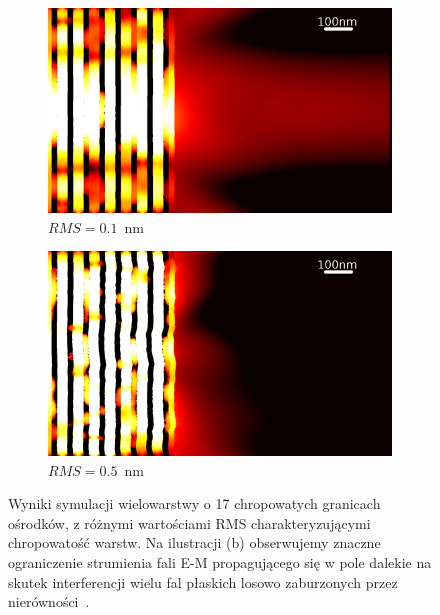 \begin{figure}
	\centering
	\begin{subfigure}[b]{.45\textwidth}
		\includegraphics[width=\textwidth]{images/multilayer/oer-rms01.png}
		\caption{$RMS=0.1$~nm}
	\end{subfigure}
	\begin{subfigure}[b]{.45\textwidth}
		\includegraphics[width=\textwidth]{images/multilayer/oer-rms05.png}
		\caption{$RMS=0.5$~nm}
	\end{subfigure}
	\caption{Wyniki symulacji wielowarstwy o 17 chropowatych granicach ośrodków, z różnymi wartościami RMS charakteryzującymi chropowatość warstw. Na ilustracji (b) obserwujemy znaczne ograniczenie strumienia fali E-M propagującego się w pole dalekie na skutek interferencji wielu fal płaskich losowo zaburzonych przez nierówności~\cite{pastuszczak2013engineering}.}
\end{figure}

